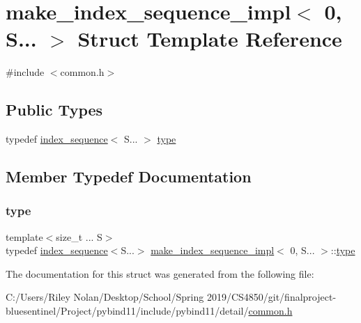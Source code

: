 \hypertarget{structmake__index__sequence__impl_3_010_00_01_s_8_8_8_01_4}{}\section{make\+\_\+index\+\_\+sequence\+\_\+impl$<$ 0, S... $>$ Struct Template Reference}
\label{structmake__index__sequence__impl_3_010_00_01_s_8_8_8_01_4}


{\ttfamily \#include $<$common.\+h$>$}

\subsection*{Public Types}
\begin{DoxyCompactItemize}
\item 
typedef \mbox{\hyperlink{structindex__sequence}{index\+\_\+sequence}}$<$ S... $>$ \mbox{\hyperlink{structmake__index__sequence__impl_3_010_00_01_s_8_8_8_01_4_aeacc616df5726d8e90eafeac0b19bd6d}{type}}
\end{DoxyCompactItemize}


\subsection{Member Typedef Documentation}
\mbox{\label{structmake__index__sequence__impl_3_010_00_01_s_8_8_8_01_4_aeacc616df5726d8e90eafeac0b19bd6d}} 
\subsubsection{\texorpdfstring{type}{type}}
{\footnotesize\ttfamily template$<$size\+\_\+t ... S$>$ \\
typedef \mbox{\hyperlink{structindex__sequence}{index\+\_\+sequence}}$<$S...$>$ \mbox{\hyperlink{structmake__index__sequence__impl}{make\+\_\+index\+\_\+sequence\+\_\+impl}}$<$ 0, S... $>$\+::\mbox{\hyperlink{structmake__index__sequence__impl_3_010_00_01_s_8_8_8_01_4_aeacc616df5726d8e90eafeac0b19bd6d}{type}}}



The documentation for this struct was generated from the following file\+:\begin{DoxyCompactItemize}
\item 
C\+:/\+Users/\+Riley Nolan/\+Desktop/\+School/\+Spring 2019/\+C\+S4850/git/finalproject-\/bluesentinel/\+Project/pybind11/include/pybind11/detail/\mbox{\hyperlink{detail_2common_8h}{common.\+h}}\end{DoxyCompactItemize}
